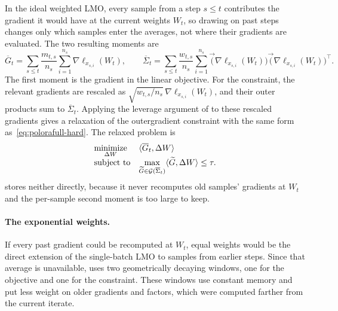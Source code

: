 In the ideal weighted LMO, every sample from a step $s\le t$ contributes
the gradient it would have at the current weights $W_t$, so drawing on past
steps changes only which samples enter the averages, not where their
gradients are evaluated. The two resulting moments are
\[
\overline G_t
  =
  \sum_{s\le t}\frac{m_{t,s}}{n_s}\sum_{i=1}^{n_s}
  \nabla\ell_{x_{s,i}}(W_t),
\qquad
\overline\Sigma_t
  =
  \sum_{s\le t}\frac{w_{t,s}}{n_s}\sum_{i=1}^{n_s}
  \vec(\nabla\ell_{x_{s,i}}(W_t))
  \vec(\nabla\ell_{x_{s,i}}(W_t))^\top .
\]
The first moment is the gradient in the linear objective. For the
constraint, the relevant gradients are rescaled as
$\sqrt{w_{t,s}/n_s}\,\nabla\ell_{x_{s,i}}(W_t)$, and their outer
products sum to $\overline\Sigma_t$. Applying the leverage argument of
 to these rescaled gradients gives a relaxation of
the outergradient constraint with the same form
as~\eqref{eq:polorafull-hard}. The relaxed problem is
\begin{equation}\label{eq:weighted-relaxed-01}
 \begin{array}{ll}
  \underset{\Delta W}{\mathrm{minimize}} &
  \langle \overline G_t, \Delta W \rangle \\[2pt]
  \mbox{subject to} &
  \displaystyle
  \max_{\widetilde{G}\in\mathcal{G}(\overline\Sigma_t)}
  \langle \widetilde{G},\Delta W \rangle\le\tau .
  \end{array}
\end{equation}
 stores neither directly, because it never recomputes old
samples' gradients at $W_t$ and the per-sample second moment is too large
to keep.

\paragraph{The exponential weights.}
If every past gradient could be recomputed at $W_t$, equal weights would be
the direct extension of the single-batch LMO to samples from earlier steps.
Since that average is unavailable,  uses two geometrically decaying windows,
one for the objective and one for the constraint. These windows use
constant memory and put less weight on older gradients and factors, which
were computed farther from the current iterate.

